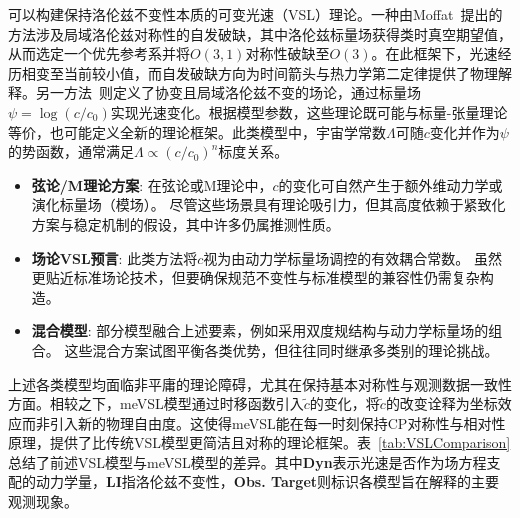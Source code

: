 \documentclass[jkps,preprint,fleqn]{revtex4}
\newcommand{\tc}{\tilde{c}}
\begin{document}
可以构建保持洛伦兹不变性本质的可变光速（VSL）理论。一种由Moffat~\cite{Moffat:1992ud}提出的方法涉及局域洛伦兹对称性的自发破缺，其中洛伦兹标量场获得类时真空期望值，从而选定一个优先参考系并将$O(3,1)$对称性破缺至$O(3)$。在此框架下，光速经历相变至当前较小值，而自发破缺方向为时间箭头与热力学第二定律提供了物理解释。另一方法~\cite{Magueijo:2000zt}则定义了协变且局域洛伦兹不变的场论，通过标量场$\psi = \log(c/c_0)$实现光速变化。根据模型参数，这些理论既可能与标量-张量理论等价，也可能定义全新的理论框架。此类模型中，宇宙学常数$\Lambda$可随$c$变化并作为$\psi$的势函数，通常满足$\Lambda \propto (c/c_0)^n$标度关系\cite{Manida:1999rx,Barrow:1999st,Stepanov:1999ax,Magueijo:2000au,Moffat:2002nm}。

\begin{itemize}
  \item \textbf{弦论/M理论方案}:
    在弦论或M理论中，$c$的变化可自然产生于额外维动力学或演化标量场（模场）\cite{Kaelbermann:1998hu,Randall:1999ee,Randall:1999vf,Kiritsis:1999tx,Chung:1999xg,Alexander:1999cb,Ishihara:2000nf,Csaki:2000dm,Youm:2001sw,Youm:2001zk,Grojean:2001pv,Youm:2001zp}。
    尽管这些场景具有理论吸引力，但其高度依赖于紧致化方案与稳定机制的假设，其中许多仍属推测性质。
   \item \textbf{场论VSL预言}:
    此类方法将$c$视为由动力学标量场调控的有效耦合常数\cite{Drummond:1979pp,Novello:1988ma,Barton:1989dq,Scharnhorst:1990sr,Shore:1995fz,Colladay:1995qb,Coleman:1998ti,Bertolami:1999da,Shore:2000bs,Greenberg:2002uu,Teyssandier:2003qh,Shore:2003zc,Blasone:2003wf}。
    虽然更贴近标准场论技术，但要确保规范不变性与标准模型的兼容性仍需复杂构造。
    \item \textbf{混合模型}:
    部分模型融合上述要素，例如采用双度规结构与动力学标量场的组合\cite{Alexander:2001dr,Burgess:2002tb}。
    这些混合方案试图平衡各类优势，但往往同时继承多类别的理论挑战。
\end{itemize}

上述各类模型均面临非平庸的理论障碍，尤其在保持基本对称性与观测数据一致性方面。相较之下，meVSL模型通过时移函数引入$\tc$的变化，将$\tc$的改变诠释为坐标效应而非引入新的物理自由度。这使得meVSL能在每一时刻保持CP对称性与相对性原理，提供了比传统VSL模型更简洁且对称的理论框架。表~\ref{tab:VSLComparison}总结了前述VSL模型与meVSL模型的差异。其中\textbf{Dyn}表示光速是否作为场方程支配的动力学量，\textbf{LI}指洛伦兹不变性，\textbf{Obs. Target}则标识各模型旨在解释的主要观测现象。
\end{document}
